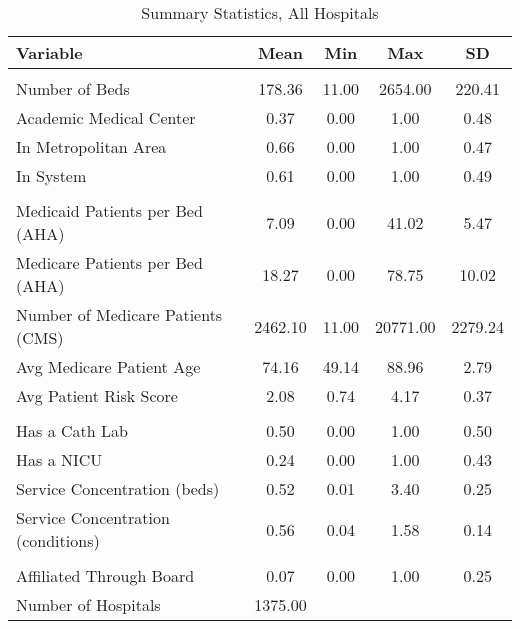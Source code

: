 \begin{table}[ht!]

\caption{Summary Statistics, All Hospitals\label{all_sumstats}}
\centering
\begin{tabular}[t]{lcccc}
\toprule
Variable & Mean & Min & Max & SD\\
\midrule
\addlinespace[0.3em]
\multicolumn{5}{l}{\textbf{Characteristics}}\\
\hspace{1em}Number of Beds & 178.36 & 11.00 & 2654.00 & 220.41\\
\hspace{1em}Academic Medical Center & 0.37 & 0.00 & 1.00 & 0.48\\
\hspace{1em}In Metropolitan Area & 0.66 & 0.00 & 1.00 & 0.47\\
\hspace{1em}In System & 0.61 & 0.00 & 1.00 & 0.49\\
\addlinespace[0.3em]
\multicolumn{5}{l}{\textbf{Patients}}\\
\hspace{1em}Medicaid Patients per Bed (AHA) & 7.09 & 0.00 & 41.02 & 5.47\\
\hspace{1em}Medicare Patients per Bed (AHA) & 18.27 & 0.00 & 78.75 & 10.02\\
\hspace{1em}Number of Medicare Patients (CMS) & 2462.10 & 11.00 & 20771.00 & 2279.24\\
\hspace{1em}Avg Medicare Patient Age & 74.16 & 49.14 & 88.96 & 2.79\\
\hspace{1em}Avg Patient Risk Score & 2.08 & 0.74 & 4.17 & 0.37\\
\addlinespace[0.3em]
\multicolumn{5}{l}{\textbf{Services}}\\
\hspace{1em}Has a Cath Lab & 0.50 & 0.00 & 1.00 & 0.50\\
\hspace{1em}Has a NICU & 0.24 & 0.00 & 1.00 & 0.43\\
\hspace{1em}Service Concentration (beds) & 0.52 & 0.01 & 3.40 & 0.25\\
\hspace{1em}Service Concentration (conditions) & 0.56 & 0.04 & 1.58 & 0.14\\
\addlinespace[0.3em]
\multicolumn{5}{l}{\textbf{Board Affiliation}}\\
\hspace{1em}Affiliated Through Board & 0.07 & 0.00 & 1.00 & 0.25\\
Number of Hospitals & 1375.00 &  &  & \\
\bottomrule
\end{tabular}
\end{table}

